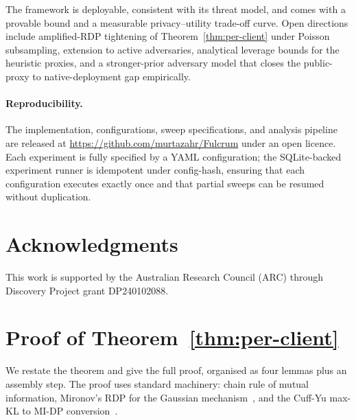\documentclass[letterpaper,journal]{IEEEtran}
\begin{document}
The framework is deployable, consistent with its threat model, and
comes with a provable bound and a measurable privacy--utility trade-off
curve. Open directions include amplified-RDP tightening of
Theorem~\ref{thm:per-client} under Poisson subsampling, extension to
active adversaries, analytical leverage bounds for the heuristic
proxies, and a stronger-prior adversary model that closes the
public-proxy to native-deployment gap empirically.

\paragraph{Reproducibility.}
The implementation, configurations, sweep specifications, and analysis
pipeline are released at
\url{https://github.com/murtazahr/Fulcrum} under an open licence. Each
experiment is fully specified by a YAML configuration; the SQLite-backed
experiment runner is idempotent under config-hash, ensuring that each
configuration executes exactly once and that partial sweeps can be
resumed without duplication.

\section*{Acknowledgments}
This work is supported by the Australian Research Council (ARC) through
Discovery Project grant DP240102088.




\appendix

\section{Proof of Theorem~\ref{thm:per-client}}
\label{app:thm1}

We restate the theorem and give the full proof, organised as four
lemmas plus an assembly step. The proof uses standard machinery:
chain rule of mutual information, Mironov's RDP for the Gaussian
mechanism~\cite{mironov2017rdp}, and the Cuff-Yu max-KL to MI-DP
conversion~\cite{cuff2016mi}.
\end{document}
